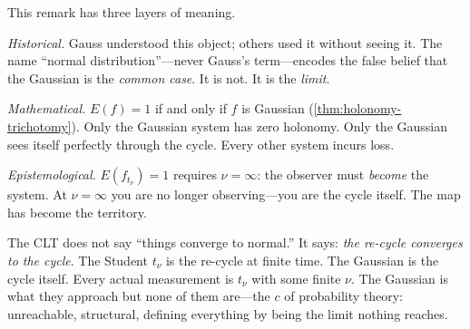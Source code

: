 \begin{remark}\label{rem:only-gauss}
This remark has three layers of meaning.

\emph{Historical.} Gauss understood this object; others used it without seeing it. The name ``normal distribution''---never Gauss's term---encodes the false belief that the Gaussian is the \emph{common case}. It is not. It is the \emph{limit}.

\emph{Mathematical.} $E(f) = 1$ if and only if $f$ is Gaussian (\cref{thm:holonomy-trichotomy}). Only the Gaussian system has zero holonomy. Only the Gaussian sees itself perfectly through the cycle. Every other system incurs loss.

\emph{Epistemological.} $E(f_{t_\nu}) = 1$ requires $\nu = \infty$: the observer must \emph{become} the system. At $\nu = \infty$ you are no longer observing---you are the cycle itself. The map has become the territory.

The CLT does not say ``things converge to normal.'' It says: \emph{the re-cycle converges to the cycle}. The Student $t_\nu$ is the re-cycle at finite time. The Gaussian is the cycle itself. Every actual measurement is $t_\nu$ with some finite $\nu$. The Gaussian is what they approach but none of them are---the $c$ of probability theory: unreachable, structural, defining everything by being the limit nothing reaches.
\end{remark}

